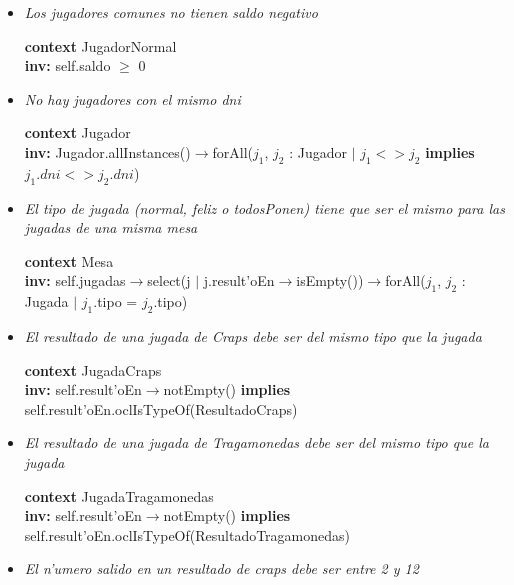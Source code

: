 \begin{itemize}
\item \textit{Los jugadores comunes no tienen saldo negativo}

\textbf{context} JugadorNormal \\ \textbf{inv:}
    self.saldo $\geq$ 0
  
  

\item \textit{No hay jugadores con el mismo dni}

\textbf{context}  Jugador \\ \textbf{inv:}
    Jugador.allInstances()$\rightarrow$forAll($j_{1}$, $j_{2}$ : Jugador $|$ $j_{1} < > j_{2}$ \textbf{implies} $j_{1}.dni < > j_{2}.dni$)



\item \textit{El tipo de jugada (normal, feliz o todosPonen) tiene que ser el mismo para las jugadas de una misma mesa}

\textbf{context} Mesa \\ \textbf{inv:}
    self.jugadas$\rightarrow$select(j $|$ j.result'oEn$\rightarrow$isEmpty())$\rightarrow$forAll($j_{1}$, $j_{2}$ : Jugada $|$ $j_{1}$.tipo = $j_{2}$.tipo)
  
  

\item \textit{El resultado de una jugada de Craps debe ser del mismo tipo que la jugada}

\textbf{context} JugadaCraps \\ \textbf{inv:}
    self.result'oEn$\rightarrow$notEmpty() \textbf{implies} self.result'oEn.oclIsTypeOf(ResultadoCraps)



\item \textit{El resultado de una jugada de Tragamonedas debe ser del mismo tipo que la jugada}

\textbf{context} JugadaTragamonedas \\ \textbf{inv:}
    self.result'oEn$\rightarrow$notEmpty() \textbf{implies} self.result'oEn.oclIsTypeOf(ResultadoTragamonedas)



\item \textit{El n'umero salido en un resultado de craps debe ser entre 2 y 12}


\end{itemize}
